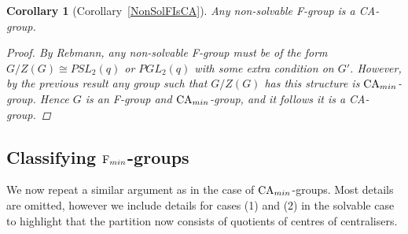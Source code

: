\documentclass[a4paper,11pt]{article}
\theoremstyle{plain}
\newtheorem*{cor*}{Corollary}
\numberwithin{thm}{section}
\begin{document}
\begin{cor*}[Corollary~\ref{NonSolFIsCA}]
Any non-solvable F-group is a CA-group.
\begin{proof}
By Rebmann, any non-solvable F-group must be of the form $G/Z(G)\cong PSL_2(q)$ or $PGL_2(q)$ with some extra condition on $G'$.
However, by the previous result any group such that $G/Z(G)$ has this structure is ${\rm CA}_{min}$-group.
Hence $G$ is an F-group and ${\rm CA}_{min}$-group, and it follows it is a CA-group. 
\end{proof}
\end{cor*}


\subsection{Classifying ${\rm F}_{min}$-groups}

We now repeat a similar argument as in the case of ${\rm CA}_{min}$-groups. Most details are omitted, however we include details for cases (1) and (2) in the solvable case to highlight that the partition now consists of quotients of centres of centralisers. 
\end{document}
